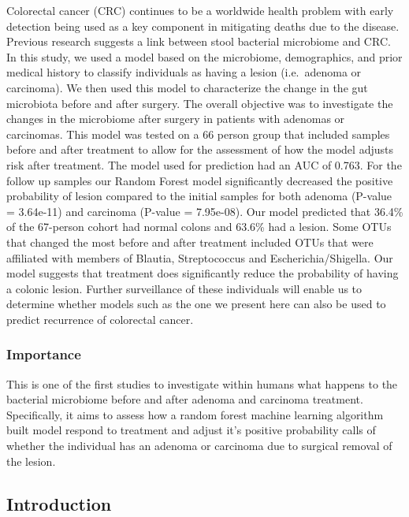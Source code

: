 \documentclass[12pt,]{article}
\begin{document}
Colorectal cancer (CRC) continues to be a worldwide health problem with
early detection being used as a key component in mitigating deaths due
to the disease. Previous research suggests a link between stool
bacterial microbiome and CRC. In this study, we used a model based on
the microbiome, demographics, and prior medical history to classify
individuals as having a lesion (i.e.~adenoma or carcinoma). We then used
this model to characterize the change in the gut microbiota before and
after surgery. The overall objective was to investigate the changes in
the microbiome after surgery in patients with adenomas or carcinomas.
This model was tested on a 66 person group that included samples before
and after treatment to allow for the assessment of how the model adjusts
risk after treatment. The model used for prediction had an AUC of 0.763.
For the follow up samples our Random Forest model significantly
decreased the positive probability of lesion compared to the initial
samples for both adenoma (P-value = 3.64e-11) and carcinoma (P-value =
7.95e-08). Our model predicted that 36.4\% of the 67-person cohort had
normal colons and 63.6\% had a lesion. Some OTUs that changed the most
before and after treatment included OTUs that were affiliated with
members of Blautia, Streptococcus and Escherichia/Shigella. Our model
suggests that treatment does significantly reduce the probability of
having a colonic lesion. Further surveillance of these individuals will
enable us to determine whether models such as the one we present here
can also be used to predict recurrence of colorectal cancer.

\newpage

\subsubsection{Importance}\label{importance}

This is one of the first studies to investigate within humans what
happens to the bacterial microbiome before and after adenoma and
carcinoma treatment. Specifically, it aims to assess how a random forest
machine learning algorithm built model respond to treatment and adjust
it's positive probability calls of whether the individual has an adenoma
or carcinoma due to surgical removal of the lesion.

\newpage

\subsection{Introduction}\label{introduction}
\end{document}
